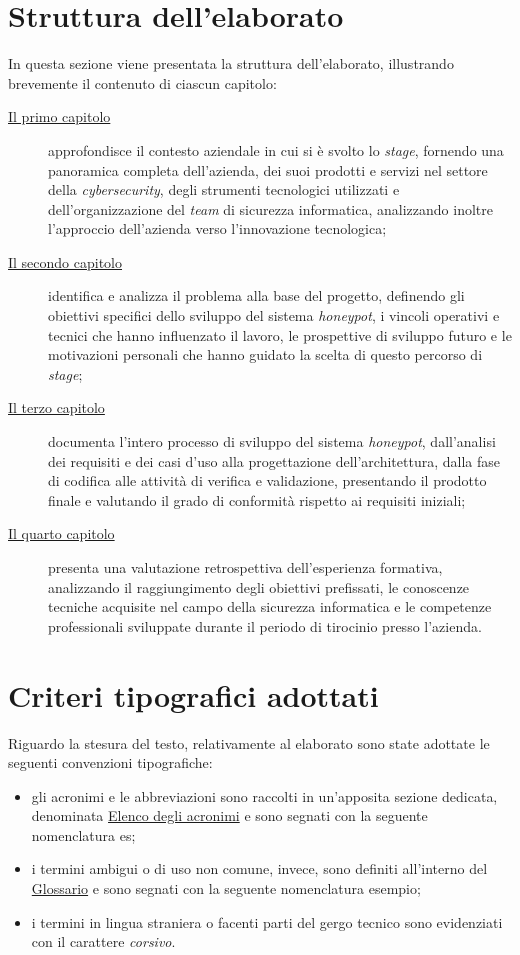 \section*{Struttura dell'elaborato}
In questa sezione viene presentata la struttura dell'elaborato, illustrando brevemente il contenuto di ciascun capitolo:
\begin{description}
    \item[{\hyperref[chap:]{Il primo capitolo}}] approfondisce il contesto aziendale in cui si è svolto lo \textit{stage}, fornendo una panoramica completa dell'azienda, dei suoi prodotti e servizi nel settore della \textit{cybersecurity}, degli strumenti tecnologici utilizzati e dell'organizzazione del \textit{team} di sicurezza informatica, analizzando inoltre l'approccio dell'azienda verso l'innovazione tecnologica;

    \item[{\hyperref[chap:]{Il secondo capitolo}}] identifica e analizza il problema alla base del progetto, definendo gli obiettivi specifici dello sviluppo del sistema \textit{honeypot}, i vincoli operativi e tecnici che hanno influenzato il lavoro, le prospettive di sviluppo futuro e le motivazioni personali che hanno guidato la scelta di questo percorso di \textit{stage};

    \item[{\hyperref[chap:]{Il terzo capitolo}}] documenta l'intero processo di sviluppo del sistema \textit{honeypot}, dall'analisi dei requisiti e dei casi d'uso alla progettazione dell'architettura, dalla fase di codifica alle attività di verifica e validazione, presentando il prodotto finale e valutando il grado di conformità rispetto ai requisiti iniziali;
    
    \item[{\hyperref[chap:]{Il quarto capitolo}}] presenta una valutazione retrospettiva dell'esperienza formativa, analizzando il raggiungimento degli obiettivi prefissati, le conoscenze tecniche acquisite nel campo della sicurezza informatica e le competenze professionali sviluppate durante il periodo di tirocinio presso l'azienda.
\end{description}
\section*{Criteri tipografici adottati}
Riguardo la stesura del testo, relativamente al elaborato sono state adottate le seguenti convenzioni tipografiche:
\begin{itemize}
	\item gli acronimi e le abbreviazioni sono raccolti in un'apposita sezione dedicata, denominata \hyperref[acronimi]{Elenco degli acronimi} e sono segnati con la seguente nomenclatura \gls{es};
    \item i termini ambigui o di uso non comune, invece, sono definiti all'interno del \hyperref[glossario]{Glossario} e sono segnati con la seguente nomenclatura \gls{esempio};
	\item i termini in lingua straniera o facenti parti del gergo tecnico sono evidenziati con il carattere \textit{corsivo}.
\end{itemize}
\endgroup
\vfill

